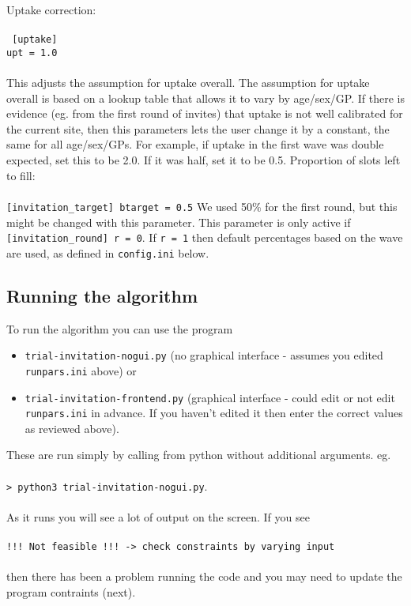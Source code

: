 \documentclass[a4paper]{article}
\begin{document}
Uptake correction: \\ \\
\texttt{
[uptake]\\
upt = 1.0}\\ \\
This adjusts the assumption for uptake overall. The assumption for uptake overall is based on a lookup table that allows it to vary by age/sex/GP. If there is evidence (eg. from the first round of invites) that uptake is not well calibrated for the current site, then this parameters lets the user change it by a constant, the same for all age/sex/GPs. For example, if uptake in the first wave was double expected, set this to be 2.0. If it was half, set it to be 0.5.
Proportion of slots left to fill: \\ \\
\texttt{[invitation\_target]
btarget = 0.5}
We used 50\% for the first round, but this might be changed with this parameter. This parameter is only active if 
\texttt{[invitation\_round] 
r = 0}. If \texttt{r = 1} then default percentages based on the wave are used, as defined in \texttt{config.ini} below.

\subsection{Running the algorithm}

To run the algorithm you can use the program 
\begin{itemize}
	\item \texttt{trial-invitation-nogui.py} (no graphical interface - assumes you edited \texttt{runpars.ini} above) or 
	\item \texttt{trial-invitation-frontend.py} (graphical interface - could edit or not edit \texttt{runpars.ini} in advance. If you haven't edited it then enter the correct values as reviewed above). 
\end{itemize}
These are run simply by calling from python without additional arguments. eg.\\
\\
\texttt{> python3 trial-invitation-nogui.py}.\\
\\ As it runs you will see a lot of output on the screen. If you see\\
\\ \texttt{!!! Not feasible !!! -> check constraints by varying input} \\
\\ then there has been a problem running the code and you may need to update the program contraints (next).
\end{document}
